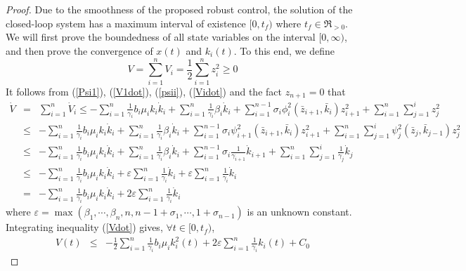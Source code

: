 \documentclass{tSYS2e}
\theoremstyle{plain}
\theoremstyle{definition}
\begin{document}
\begin{proof}
Due to the smoothness of the proposed robust control, the solution of the
closed-loop system has a maximum interval of existence $[0,t_{f})$ where $
t_{f}\in \Re _{>0}$. We will first prove the boundedness of all state
variables on the interval $[0,\infty )$, and then prove the convergence of $
x(t)$ and $k_{i}(t)$. To this end, we define
\begin{equation}
V=\sum_{i=1}^{n}V_{i}=\frac{1}{2}\sum_{i=1}^{n}z_{i}^{2}\geq 0
\label{V}
\end{equation}
It follows from (\ref{Psi1}), (\ref{V1dot}), (\ref{psii}), (\ref{Vidot}) and
the fact $z_{n+1}=0$ that
\begin{eqnarray}
\dot{V} &=&\sum_{i=1}^{n}\dot{V}_{i}
\leq-\sum_{i=1}^{n}\frac{1}{\gamma _{i}}b_{i}\mu _{i}k_{i}\dot{k}
_{i}+\sum_{i=1}^{n}\frac{1}{\gamma _{i}}\beta _{i}\dot{k}_{i}
+\sum_{i=1}^{n-1}\sigma _{i}\phi _{i}^{2}(\bar{z}_{i+1},\bar{k}
_{i})z_{i+1}^{2}+\sum_{i=1}^{n}\sum_{j=1}^{i}z_{j}^{2}\nonumber \\
&\leq &-\sum_{i=1}^{n}\frac{1}{\gamma _{i}}b_{i}\mu _{i}k_{i}\dot{k}
_{i}+\sum_{i=1}^{n}\frac{1}{\gamma _{i}}\beta _{i}\dot{k}_{i}
+\sum_{i=1}^{n-1}\sigma _{i}\psi _{i+1}^{2}(\bar{z}_{i+1},\bar{k
}_{i})z_{i+1}^{2}
+\sum_{i=1}^{n}\sum_{j=1}^{i}\psi
_{j}^{2}(\bar{z}_{j},\bar{k}_{j-1})z_{j}^{2}  \nonumber \\
&\leq &-\sum_{i=1}^{n}\frac{1}{\gamma _{i}}b_{i}\mu _{i}k_{i}\dot{k}
_{i}+\sum_{i=1}^{n}\frac{1}{\gamma _{i}}\beta _{i}\dot{k}_{i}
+\sum_{i=1}^{n-1}\sigma _{i}\frac{1}{\gamma _{i+1}}\dot{k}
_{i+1}+\sum_{i=1}^{n}\sum_{j=1}^{i}\frac{1}{\gamma _{j}}
\dot{k}_{j}  \nonumber \\
&\leq &-\sum_{i=1}^{n}\frac{1}{\gamma _{i}}b_{i}\mu _{i}k_{i}\dot{k}
_{i}+\varepsilon \sum_{i=1}^{n}\frac{1}{\gamma _{i}}\dot{k}
_{i}+\varepsilon \sum_{i=1}^{n}\frac{1}{\gamma _{i}}\dot{k}_{i}
\nonumber \\
&=&-\sum_{i=1}^{n}\frac{1}{\gamma _{i}}b_{i}\mu _{i}k_{i}\dot{k}
_{i}+2\varepsilon \sum_{i=1}^{n}\frac{1}{\gamma _{i}}\dot{k}_{i}
\label{Vdot}
\end{eqnarray}
where $
\varepsilon =\max \left( \beta _{1},\cdots ,\beta _{n},n,n-1+\sigma
_{1},\cdots ,1+\sigma _{n-1}\right)$
is an unknown constant. Integrating inequality (\ref{Vdot}) gives, $\forall t\in \lbrack 0,t_{f})$,
\begin{eqnarray}
V(t)&\leq& -\frac{1}{2}\sum_{i=1}^{n}\frac{1}{\gamma _{i}}
b_{i}\mu _{i}k_{i}^{2}(t)
+2\varepsilon \sum_{i=1}^{n}\frac{1}{
\gamma _{i}}k_{i}(t)+C_{0}  \label{IntV}

\end{eqnarray}
\end{proof}
\end{document}
